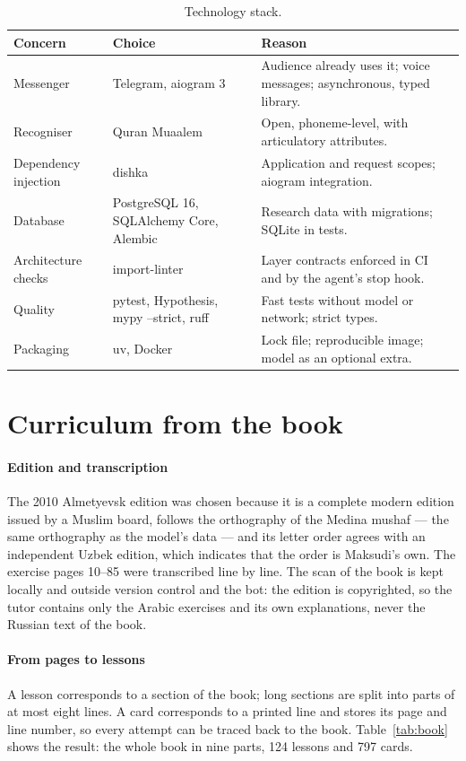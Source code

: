 \begin{table}[ht]
\centering\small
\caption{Technology stack.}
\label{tab:stack}
\begin{tabularx}{\linewidth}{@{}P{3.1cm}P{4.2cm}L@{}}
\toprule
Concern & Choice & Reason \\
\midrule
Messenger & Telegram, aiogram 3 & Audience already uses it; voice messages; asynchronous, typed library. \\
Recogniser & Quran Muaalem \cite{SRC-003} & Open, phoneme-level, with articulatory attributes. \\
Dependency injection & dishka \cite{SRC-008} & Application and request scopes; aiogram integration. \\
Database & PostgreSQL 16, SQLAlchemy Core, Alembic & Research data with migrations; SQLite in tests. \\
Architecture checks & import-linter \cite{SRC-009} & Layer contracts enforced in CI and by the agent's
stop hook. \\
Quality & pytest, Hypothesis, mypy --strict, ruff & Fast tests without model or network; strict types. \\
Packaging & uv, Docker & Lock file; reproducible image; model as an optional extra. \\
\bottomrule
\end{tabularx}
\end{table}

\section{Curriculum from the book}\label{sec:impl-curriculum}

\paragraph{Edition and transcription} The 2010 Almetyevsk edition \cite{SRC-040} was chosen because it is a
complete modern edition issued by a Muslim board, follows the orthography of the Medina mushaf --- the same
orthography as the model's data --- and its letter order agrees with an independent Uzbek edition, which
indicates that the order is Maksudi's own. The exercise pages 10--85 were transcribed line by line. The
scan of the book is kept locally and outside version control and the bot: the edition is copyrighted, so
the tutor contains only the Arabic exercises and its own explanations, never the Russian text of the book.

\paragraph{From pages to lessons} A lesson corresponds to a section of the book; long sections are split
into parts of at most eight lines. A card corresponds to a printed line and stores its page and line
number, so every attempt can be traced back to the book. Table~\ref{tab:book} shows the result: the whole
book in nine parts, 124 lessons and 797 cards.

